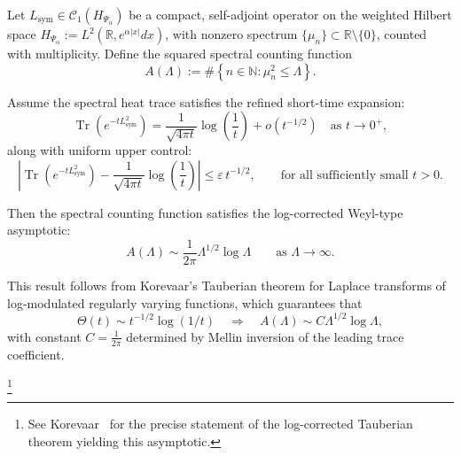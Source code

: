 \begin{lemma}
\label{lem:log_corrected_tauberian_application}
Let \( L_{\mathrm{sym}} \in \mathcal{C}_1(H_{\Psi_\alpha}) \) be a compact, self-adjoint operator on the weighted Hilbert space \( H_{\Psi_\alpha} := L^2(\mathbb{R}, e^{\alpha |x|} dx) \), with nonzero spectrum \( \{ \mu_n \} \subset \mathbb{R} \setminus \{0\} \), counted with multiplicity. Define the squared spectral counting function
\[
A(\Lambda) := \#\left\{ n \in \mathbb{N} : \mu_n^2 \le \Lambda \right\}.
\]

Assume the spectral heat trace satisfies the refined short-time expansion:
\[
\operatorname{Tr}(e^{-t L_{\mathrm{sym}}^2}) = \frac{1}{\sqrt{4\pi t}} \log\left( \frac{1}{t} \right) + o(t^{-1/2})
\quad \text{as } t \to 0^+,
\]
along with uniform upper control:
\[
\left| \operatorname{Tr}(e^{-t L_{\mathrm{sym}}^2}) - \frac{1}{\sqrt{4\pi t}} \log\left( \frac{1}{t} \right) \right| \le \varepsilon\, t^{-1/2},
\qquad \text{for all sufficiently small } t > 0.
\]

Then the spectral counting function satisfies the log-corrected Weyl-type asymptotic:
\[
A(\Lambda) \sim \frac{1}{2\pi} \Lambda^{1/2} \log \Lambda \qquad \text{as } \Lambda \to \infty.
\]

\medskip
\noindent
This result follows from Korevaar’s Tauberian theorem for Laplace transforms of log-modulated regularly varying functions, which guarantees that
\[
\Theta(t) \sim t^{-1/2} \log(1/t) \quad \Rightarrow \quad
A(\Lambda) \sim C \Lambda^{1/2} \log \Lambda,
\]
with constant \( C = \frac{1}{2\pi} \) determined by Mellin inversion of the leading trace coefficient.

\footnote{See Korevaar~\cite[Chapter~III, §5, Theorem~5.5]{Korevaar2004Tauberian} for the precise statement of the log-corrected Tauberian theorem yielding this asymptotic.}
\end{lemma}

